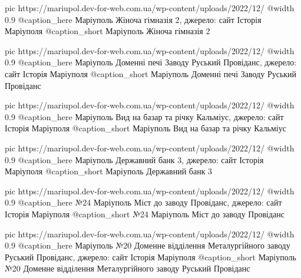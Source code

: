 	pic https://mariupol.dev-for-web.com.ua/wp-content/uploads/2022/12/%
	@width 0.9
	@caption_here Маріуполь Жіноча гімназія 2, джерело: сайт Історія Маріуполя
	@caption_short Маріуполь Жіноча гімназія 2

	pic https://mariupol.dev-for-web.com.ua/wp-content/uploads/2022/12/%
	@width 0.9
	@caption_here Маріуполь Доменні печі Заводу Руський Провіданс, джерело: сайт Історія Маріуполя
	@caption_short Маріуполь Доменні печі Заводу Руський Провіданс

	pic https://mariupol.dev-for-web.com.ua/wp-content/uploads/2022/12/%
	@width 0.9
	@caption_here Маріуполь Вид на базар та річку Кальміус, джерело: сайт Історія Маріуполя
	@caption_short Маріуполь Вид на базар та річку Кальміус

	pic https://mariupol.dev-for-web.com.ua/wp-content/uploads/2022/12/%
	@width 0.9
	@caption_here Маріуполь Державний банк 3, джерело: сайт Історія Маріуполя
	@caption_short Маріуполь Державний банк 3

	pic https://mariupol.dev-for-web.com.ua/wp-content/uploads/2022/12/%
	@width 0.9
	@caption_here №24 Маріуполь Міст до заводу Провіданс, джерело: сайт Історія Маріуполя
	@caption_short №24 Маріуполь Міст до заводу Провіданс

	pic https://mariupol.dev-for-web.com.ua/wp-content/uploads/2022/12/%
	@width 0.9
	@caption_here Маріуполь №20 Доменне відділення Металургійного заводу Руський Провіданс, джерело: сайт Історія Маріуполя
	@caption_short Маріуполь №20 Доменне відділення Металургійного заводу Руський Провіданс

